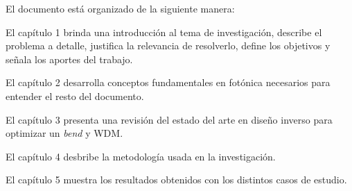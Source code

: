 
El documento está organizado de la siguiente manera:

El capítulo 1 brinda una introducción al tema de investigación, describe el problema a detalle, justifica la relevancia de resolverlo, define los objetivos y señala los aportes del trabajo.

El capítulo 2 desarrolla conceptos fundamentales en fotónica necesarios para entender el resto del documento.


El capítulo 3 presenta una revisión del estado del arte en diseño inverso para
optimizar un \emph{bend} y WDM.


El capítulo 4 desbribe la metodología usada en la investigación.


El capítulo 5 muestra los resultados obtenidos con los distintos casos de estudio. 


